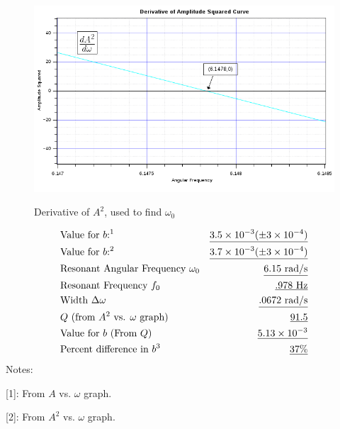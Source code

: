 \documentclass[twocolumn,english]{IEEEtran}
\theoremstyle{plain}
\theoremstyle{plain}
\begin{document}
\begin{figure}[h!]
  \begin{centering}
  \begin{center}
  \includegraphics[width=\linewidth]{./PlotDerivative.png}
  \label{fig:graph_deriv}
  \caption{Derivative of $A^2$, used to find $\omega_0$}
  \end{center}
  \par\end{centering}
\end{figure}


\begin{align*}
 &\text{Value for $b$:\footnotemark[1]} 		&\text{\underline{$3.5\times 10^{-3} (\pm 3\times 10^{-4})$}} \\
 &\text{Value for $b$:\footnotemark[2]} 		&\text{\underline{$3.7\times 10^{-3} (\pm 3\times 10^{-4})$}} \\
 &\text{Resonant Angular Frequency $\omega_0$}			&\text{\underline{$6.15$ rad/s}} \\
 &\text{Resonant Frequency $f_0$}				&\text{\underline{$.978$ Hz}} \\
 &\text{Width $\Delta \omega$} 					&\text{\underline{.0672 rad/s}} \\
 &\text{$Q$ (from $A^2$ vs. $\omega$ graph)} 			&\text{\underline{91.5}} \\
 &\text{Value for $b$ (From $Q$)} 				&\text{\underline{$5.13\times 10^{-3}$}} \\
 &\text{Percent difference in $b$\footnotemark[3]} 				&\text{\underline{37\%}} \\
\end{align*}
Notes:

[1]: From $A$ vs. $\omega$ graph.

[2]: From $A^2$ vs. $\omega$ graph.
\end{document}
